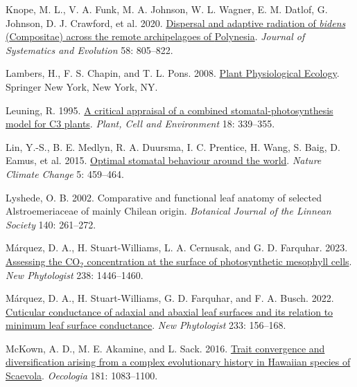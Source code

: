 \documentclass[
  letterpaper,
  DIV=11,
  numbers=noendperiod]{scrartcl}
\newlength{\cslhangindent}
\newlength{\cslentryspacingunit} %
\newenvironment{CSLReferences}[2] %
 {%
  \setlength{\parindent}{0pt}
  \ifodd #1
  \let\oldpar\par
  \def\par{\hangindent=\cslhangindent\oldpar}
  \fi
  \setlength{\parskip}{#2\cslentryspacingunit}
 }%
 {}
\begin{document}
\begin{CSLReferences}{1}{0}
\leavevmode{}%
Knope, M. L., V. A. Funk, M. A. Johnson, W. L. Wagner, E. M. Datlof, G.
Johnson, D. J. Crawford, et al. 2020.
\href{https://doi.org/10.1111/jse.12704}{Dispersal and adaptive
radiation of \emph{bidens} ({Compositae}) across the remote
archipelagoes of {Polynesia}}. \emph{Journal of Systematics and
Evolution} 58: 805--822.

\leavevmode{}%
Lambers, H., F. S. Chapin, and T. L. Pons. 2008.
\href{https://doi.org/10.1007/978-0-387-78341-3}{Plant {Physiological}
{Ecology}}. Springer New York, New York, NY.

\leavevmode{}%
Leuning, R. 1995.
\href{https://doi.org/10.1111/j.1365-3040.1995.tb00370.x}{A critical
appraisal of a combined stomatal-photosynthesis model for {C3} plants}.
\emph{Plant, Cell and Environment} 18: 339--355.

\leavevmode{}%
Lin, Y.-S., B. E. Medlyn, R. A. Duursma, I. C. Prentice, H. Wang, S.
Baig, D. Eamus, et al. 2015.
\href{https://doi.org/10.1038/nclimate2550}{Optimal stomatal behaviour
around the world}. \emph{Nature Climate Change} 5: 459--464.

\leavevmode{}%
Lyshede, O. B. 2002. Comparative and functional leaf anatomy of selected
{Alstroemeriaceae} of mainly {Chilean} origin. \emph{Botanical Journal
of the Linnean Society} 140: 261--272.

\leavevmode{}%
Márquez, D. A., H. Stuart-Williams, L. A. Cernusak, and G. D. Farquhar.
2023. \href{https://doi.org/10.1111/nph.18784}{Assessing the
{CO}\(_{\textrm{2}}\) concentration at the surface of photosynthetic
mesophyll cells}. \emph{New Phytologist} 238: 1446--1460.

\leavevmode{}%
Márquez, D. A., H. Stuart-Williams, G. D. Farquhar, and F. A. Busch.
2022. \href{https://doi.org/10.1111/nph.17588}{Cuticular conductance of
adaxial and abaxial leaf surfaces and its relation to minimum leaf
surface conductance}. \emph{New Phytologist} 233: 156--168.

\leavevmode{}%
McKown, A. D., M. E. Akamine, and L. Sack. 2016.
\href{https://doi.org/10.1007/s00442-016-3640-3}{Trait convergence and
diversification arising from a complex evolutionary history in
{Hawaiian} species of {Scaevola}}. \emph{Oecologia} 181: 1083--1100.


\end{CSLReferences}
\end{document}
